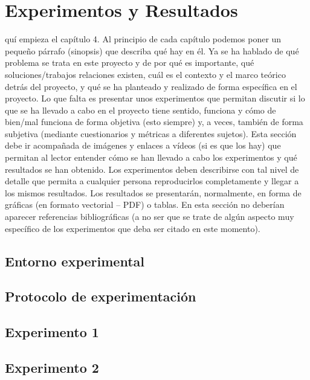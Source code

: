 \documentclass[a4paper,11pt,leqno, twoside]{memoir}
\begin{document}
\clearemptydoublepage
\chapter{Experimentos y Resultados}
\label{cap:experimentos_resultados}
\minitoc
\vspace{1cm}
quí empieza el capítulo 4. Al principio de cada capítulo podemos poner un pequeño párrafo (sinopsis) que describa qué hay en él. Ya se ha hablado de qué problema se trata en este proyecto y de por qué es importante, qué soluciones/trabajos relaciones existen, cuál es el contexto y el marco teórico detrás del proyecto, y qué se ha planteado y realizado de forma específica en el proyecto. Lo que falta es presentar unos experimentos que permitan discutir si lo que se ha llevado a cabo en el proyecto tiene sentido, funciona y cómo de bien/mal funciona de forma objetiva (esto siempre) y, a veces, también de forma subjetiva (mediante cuestionarios y métricas a diferentes sujetos). Esta sección debe ir acompañada de imágenes y enlaces a vídeos (si es que los hay) que permitan al lector entender cómo se han llevado a cabo los experimentos y qué resultados se han obtenido. Los experimentos deben describirse con tal nivel de detalle que permita a cualquier persona reproducirlos completamente y llegar a los mismos resultados. Los resultados se presentarán, normalmente, en forma de gráficas (en formato vectorial -- PDF) o tablas. En esta sección no deberían aparecer referencias bibliográficas (a no ser que se trate de algún aspecto muy específico de los experimentos que deba ser citado en este momento).
\newpage

\section{Entorno experimental}
\label{sec:entorno_experimetal}

\section{Protocolo de experimentación}
\label{sec:protocolo}

\section{Experimento 1}
\label{sec:experimento_1}

\section{Experimento 2}
\label{sec:experimento_2}
\end{document}
